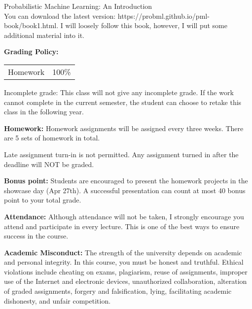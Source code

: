 \documentclass[a4paper,10pt]{article}
\begin{document}
Probabilistic Machine Learning: An Introduction \\
You can download the latest version: https://probml.github.io/pml-book/book1.html. 
 I will loosely follow this book, however, I will put some additional material into it. 


\textbf{Grading Policy:}

\begin{tabular}{lr}
Homework & 100\%\\
\end{tabular}


Incomplete grade: This class will not give any
incomplete grade. If the work cannot complete in the
current semester, the student can choose to retake this
class in the following year.






\textbf{Homework:} Homework assignments will be assigned every three weeks. There are 5 sets of homework in total. 

Late assignment turn-in is not permitted. Any assignment turned in after the deadline will NOT be graded.

\textbf{Bonus point:} Students are encouraged to present the homework projects in the showcase day (Apr 27th). A successful presentation can count at most 40 bonus point to your total grade. 


\textbf{Attendance:} Although attendance will not be taken, I strongly encourage you attend and participate in every lecture. This is one of the best ways to ensure success in the course.






\textbf{Academic Misconduct:} The strength of the university depends on academic and personal integrity. In this course, you must be honest 
and truthful. Ethical violations include cheating on exams, plagiarism, reuse of assignments, improper use 
of the Internet and electronic devices, unauthorized collaboration, alteration of graded assignments, forgery 
and falsification, lying, facilitating academic dishonesty, and unfair competition.
\end{document}
